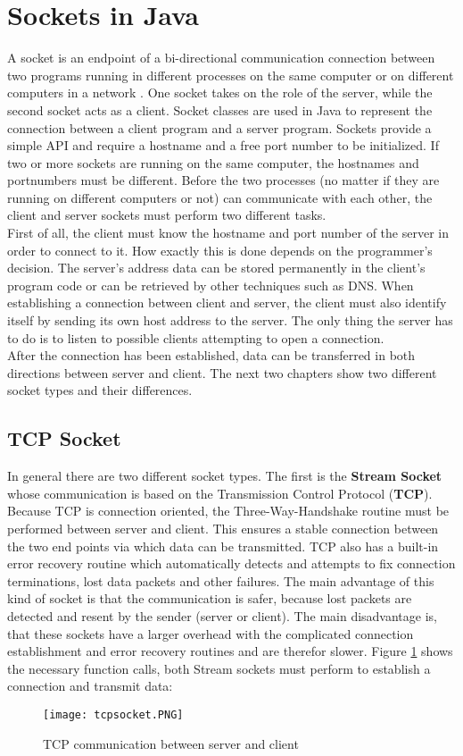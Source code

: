 \section{Sockets in Java}
A socket is an endpoint of a bi-directional communication connection between two programs running in different processes on the same computer or on different computers in a network . One socket takes on the role of the server, while the second socket acts as a client. Socket classes are used in Java to represent the connection between a client program and a server program. Sockets provide a simple API and require a hostname and a free port number to be initialized. If two or more sockets are running on the same computer, the hostnames and portnumbers must be different. Before the two processes (no matter if they are running on different computers or not) can communicate with each other, the client and server sockets must perform two different tasks.
\\
First of all, the client must know the hostname and port number of the server in order to connect to it. How exactly this is done depends on the programmer's decision. The server's address data can be stored permanently in the client's program code or can be retrieved by other techniques such as DNS. When establishing a connection between client and server, the client must also identify itself by sending its own host address to the server. The only thing the server has to do is to listen to possible clients attempting to open a connection.
\\
After the connection has been established, data can be transferred in both directions between server and client. The next two chapters show two different socket types and their differences.
\subsection{TCP Socket}
In general there are two different socket types. The first is the \textbf{Stream Socket} whose communication is based on the Transmission Control Protocol (\textbf{TCP}). Because TCP is connection oriented, the Three-Way-Handshake routine must be performed between server and client. This ensures a stable connection between the two end points via which data can be transmitted. TCP also has a built-in error recovery routine which automatically detects and attempts to fix connection terminations, lost data packets and other failures. The main advantage of this kind of socket is that the communication is safer, because lost packets are detected and resent by the sender (server or client). The main disadvantage is, that these sockets have a larger overhead with the complicated connection establishment and error recovery routines and are therefor slower. Figure \ref{tcpsocket} shows the necessary function calls, both Stream sockets must perform to establish a connection and transmit data:\\
\begin{figure}[H]
	\centering
	\texttt{[image: tcpsocket.PNG]}
	\caption{TCP communication between server and client}
	\label{tcpsocket}
\end{figure}
